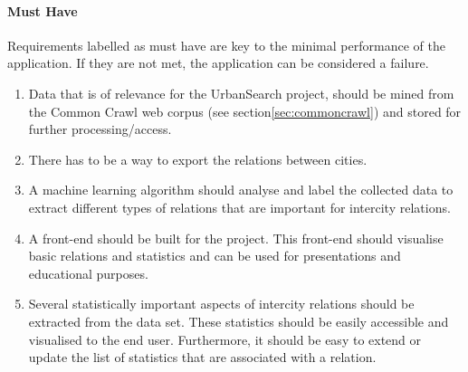 \paragraph{Must Have}
Requirements labelled as must have are key to the minimal performance of the application. If they are not met, the application can be considered a failure.

\begin{enumerate}
    \item Data that is of relevance for the UrbanSearch project, should be mined from the Common Crawl web corpus (see section\ref{sec:commoncrawl}) and stored for further processing/access.
    \item There has to be a way to export the relations between cities.
    \item A machine learning algorithm should analyse and label the collected data to extract different types of relations that are important for intercity relations.
    \item A front-end should be built for the project. This front-end should visualise basic relations and statistics and can be used for presentations and educational purposes.
    \item Several statistically important aspects of intercity relations should be extracted from the data set. These statistics should be easily accessible and visualised to the end user. Furthermore, it should be easy to extend or update the list of statistics that are associated with a relation.
\end{enumerate}

